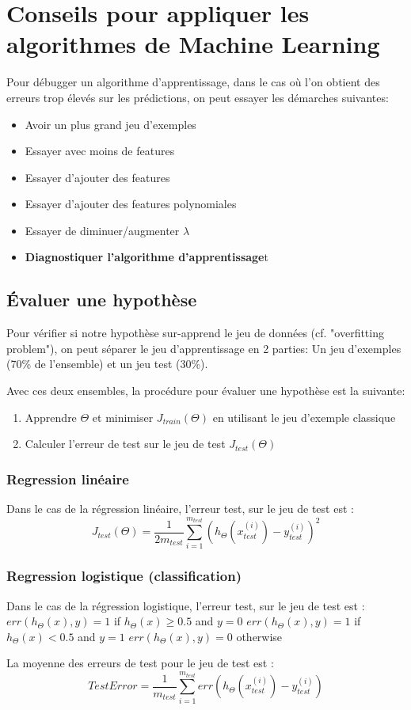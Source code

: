 \documentclass{article}
\theoremstyle{definition}
\begin{document}
\section{Conseils pour appliquer les algorithmes de Machine Learning}
Pour débugger un algorithme d'apprentissage, dans le cas où l'on obtient des erreurs trop élevés sur les prédictions, on peut essayer les démarches suivantes:
\begin{itemize}
\item Avoir un plus grand jeu d'exemples
\item Essayer avec moins de features
\item Essayer d'ajouter des features
\item Essayer d'ajouter des features polynomiales
\item Essayer de diminuer/augmenter $\lambda$
\item \textbf{Diagnostiquer l'algorithme d'apprentissage}t
\end{itemize}
\subsection{Évaluer une hypothèse}
Pour vérifier si notre hypothèse sur-apprend le jeu de données (cf. "overfitting problem"), on peut séparer le jeu d'apprentissage en 2 parties: \newline 
Un jeu d'exemples (70\% de l'ensemble) et un jeu test (30\%).
\par Avec ces deux ensembles, la procédure pour évaluer une hypothèse est la suivante:
\begin{enumerate}
\item Apprendre $\Theta$ et minimiser $J_{train}(\Theta)$ en utilisant le jeu d'exemple classique
\item Calculer l'erreur de test sur le jeu de test $J_{test}(\Theta)$ 
\end{enumerate}
\subsubsection{Regression linéaire}
Dans le cas de la régression linéaire, l'erreur test, sur le jeu de test est :
$$J_{test}(\Theta) = \frac{1}{2m_{test}} \sum_{i=1}^{m_{test}} (h_{\Theta}(x_{test}^{(i)}) - y_{test}^{(i)})^2$$
\subsubsection{Regression logistique (classification)}
Dans le cas de la régression logistique, l'erreur test, sur le jeu de test est :
\newline 
$err(h_\Theta(x),y) = 1$ if $h_\Theta(x) \geq 0.5$ and $y=0$
\newline
$err(h_\Theta(x),y) = 1$ if $h_\Theta(x) < 0.5$ and $y=1$
\newline
$err(h_\Theta(x),y) = 0$ otherwise
\par La moyenne des erreurs de test pour le jeu de test est :
$$TestError = \frac{1}{m_{test}}  \sum_{i=1}^{m_{test}} err(h_{\Theta}(x_{test}^{(i)}) - y_{test}^{(i)}) $$
\end{document}
